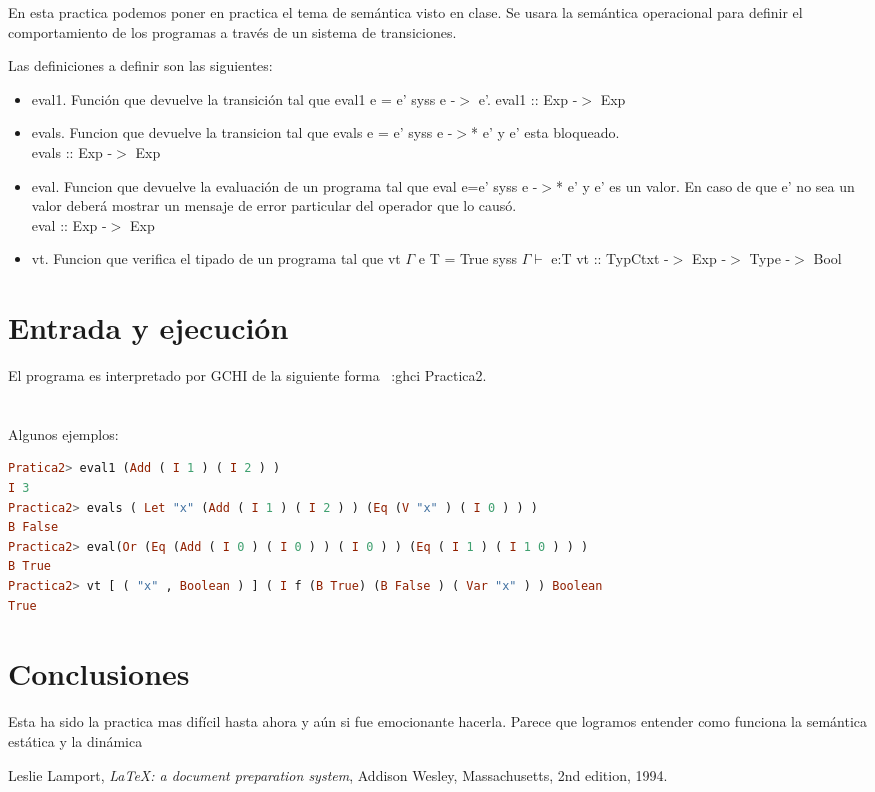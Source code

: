 \documentclass{article}
\begin{document}
En esta practica podemos poner en practica el tema de semántica visto en clase.
Se usara la semántica operacional para definir el comportamiento de los programas a través de un sistema de transiciones.

Las definiciones a definir son las siguientes:

\begin{itemize}
	\item eval1. Función que devuelve la transición tal que eval1 e = e' syss e -$>$ e'.
				eval1 :: Exp -$>$ Exp
	 \item evals. Funcion que devuelve la transicion tal que evals e = e' syss e -$>$* e' y e' esta bloqueado.\\
	 evals :: Exp -$>$ Exp
	 \item eval. Funcion que devuelve la evaluación de un programa tal que eval e=e' syss e -$>$* e' y e' es un valor. En caso de que e' no sea un valor deberá mostrar un mensaje de error particular del operador que lo causó.\\
	 eval :: Exp -$>$ Exp
	 \item vt. Funcion que verifica el tipado de un programa tal que vt $\Gamma$ e T = True syss $\Gamma \vdash$ e:T
	 vt :: TypCtxt -$>$ Exp -$>$ Type -$>$ Bool
\end{itemize}

\section{Entrada y ejecución}
El programa es interpretado por GCHI de la siguiente forma
 ~:ghci Practica2.\\
\\\\Algunos ejemplos:\\
 
\begin{lstlisting}[language=Haskell]
Pratica2> eval1 (Add ( I 1 ) ( I 2 ) )
I 3
Practica2> evals ( Let "x" (Add ( I 1 ) ( I 2 ) ) (Eq (V "x" ) ( I 0 ) ) )
B False
Practica2> eval(Or (Eq (Add ( I 0 ) ( I 0 ) ) ( I 0 ) ) (Eq ( I 1 ) ( I 1 0 ) ) )
B True
Practica2> vt [ ( "x" , Boolean ) ] ( I f (B True) (B False ) ( Var "x" ) ) Boolean
True
\end{lstlisting}

\section{Conclusiones}
Esta ha sido la practica mas difícil hasta ahora y aún si fue emocionante hacerla. 
Parece que logramos entender como funciona la semántica estática y la dinámica  


\begin{thebibliography}{9}

  Leslie Lamport,
  \emph{\LaTeX: a document preparation system},
  Addison Wesley, Massachusetts,
  2nd edition,
  1994.

\end{thebibliography}
\end{document}
